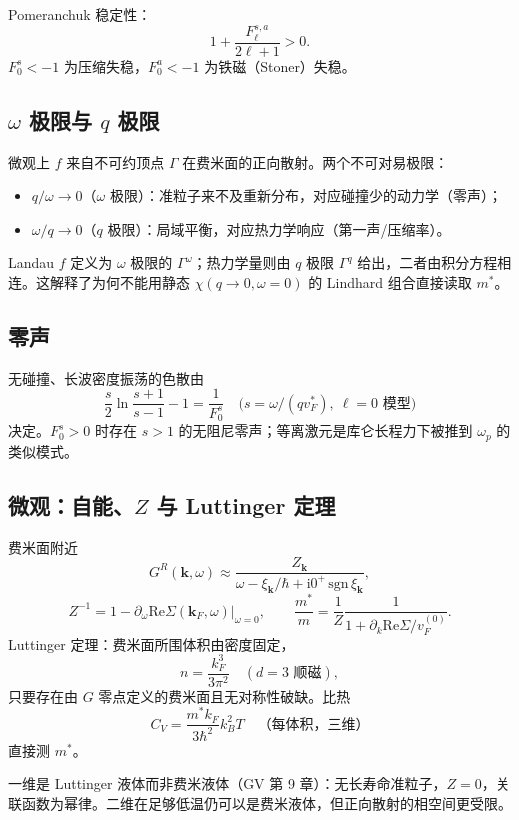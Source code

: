 Pomeranchuk 稳定性：
\begin{equation}
  1+\frac{F_\ell^{s,a}}{2\ell+1}>0.
\end{equation}
$F_0^s<-1$ 为压缩失稳，$F_0^a<-1$ 为铁磁（Stoner）失稳。

\subsection{\texorpdfstring{$\omega$}{omega} 极限与 \texorpdfstring{$q$}{q} 极限}

微观上 $f$ 来自不可约顶点 $\Gamma$ 在费米面的正向散射。两个不可对易极限：
\begin{itemize}
  \item $q/\omega\to0$（$\omega$ 极限）：准粒子来不及重新分布，对应碰撞少的动力学（零声）；
  \item $\omega/q\to0$（$q$ 极限）：局域平衡，对应热力学响应（第一声/压缩率）。
\end{itemize}
Landau $f$ 定义为 $\omega$ 极限的 $\Gamma^\omega$；热力学量则由 $q$ 极限 $\Gamma^q$ 给出，二者由积分方程相连。这解释了为何不能用静态 $\chi(q\to0,\omega=0)$ 的 Lindhard 组合直接读取 $m^*$。

\subsection{零声}

无碰撞、长波密度振荡的色散由
\begin{equation}
  \frac{s}{2}\ln\frac{s+1}{s-1}-1
  =\frac{1}{F_0^s}
  \quad
  \bigl(s=\omega/(q v_F^*),\ \ell=0\text{ 模型}\bigr)
\end{equation}
决定。$F_0^s>0$ 时存在 $s>1$ 的无阻尼零声；等离激元是库仑长程力下被推到 $\omega_p$ 的类似模式。

\subsection{微观：自能、\texorpdfstring{$Z$}{Z} 与 Luttinger 定理}

费米面附近
\begin{equation}
  G^R(\mathbf{k},\omega)
  \approx
  \frac{Z_{\mathbf{k}}}
  {\omega-\xi_{\mathbf{k}}/\hbar+\mathrm{i}0^+\,\mathrm{sgn}\,\xi_{\mathbf{k}}},
\end{equation}
\begin{equation}
  Z^{-1}
  =1-\partial_\omega\mathrm{Re}\Sigma(\mathbf{k}_F,\omega)|_{\omega=0},
  \qquad
  \frac{m^*}{m}
  =\frac{1}{Z}
  \frac{1}{1+\partial_k\mathrm{Re}\Sigma/v_F^{(0)}}.
\end{equation}
Luttinger 定理：费米面所围体积由密度固定，
\begin{equation}
  n=\frac{k_F^3}{3\pi^2}
  \quad(d=3\text{ 顺磁}),
\end{equation}
只要存在由 $G$ 零点定义的费米面且无对称性破缺。比热
\begin{equation}
  C_V=\frac{m^* k_F}{3\hbar^2}k_B^2 T
  \quad\text{（每体积，三维）}
\end{equation}
直接测 $m^*$。

\begin{note}
一维是 Luttinger 液体而非费米液体（GV 第 9 章）：无长寿命准粒子，$Z=0$，关联函数为幂律。二维在足够低温仍可以是费米液体，但正向散射的相空间更受限。
\end{note}
